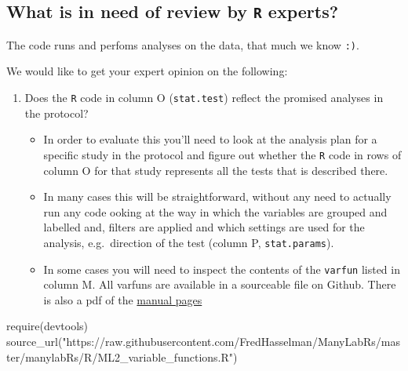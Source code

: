 \documentclass[]{article}
\newenvironment{Shaded}{\begin{snugshade}}{\end{snugshade}}
\newcommand{\KeywordTok}[1]{\textcolor[rgb]{0.94,0.87,0.69}{{#1}}}
\newcommand{\StringTok}[1]{\textcolor[rgb]{0.80,0.58,0.58}{{#1}}}
\newcommand{\NormalTok}[1]{\textcolor[rgb]{0.80,0.80,0.80}{{#1}}}
\begin{document}
\subsection{What is in need of review by \texttt{R}
experts?}\label{what-is-in-need-of-review-by-r-experts}

The code runs and perfoms analyses on the data, that much we know
\texttt{:)}.

We would like to get your expert opinion on the following:

\begin{enumerate}
\def\labelenumi{\arabic{enumi}.}
\itemsep1pt\parskip0pt
\item
  Does the \texttt{R} code in column O (\texttt{stat.test}) reflect the
  promised analyses in the protocol?

  \begin{itemize}
  \itemsep1pt\parskip0pt
  \item
    In order to evaluate this you'll need to look at the analysis plan
    for a specific study in the protocol and figure out whether the
    \texttt{R} code in rows of column O for that study represents all
    the tests that is described there.\\
  \item
    In many cases this will be straightforward, without any need to
    actually run any code ooking at the way in which the variables are
    grouped and labelled and, filters are applied and which settings are
    used for the analysis, e.g.~direction of the test (column P,
    \texttt{stat.params}).
  \item
    In some cases you will need to inspect the contents of the
    \texttt{varfun} listed in column M. All varfuns are available in a
    sourceable file on Github. There is also a pdf of the
    \href{https://github.com/FredHasselman/ManyLabRs/blob/master/ManyLabRs.pdf}{manual
    pages}
  \end{itemize}
\end{enumerate}

\begin{Shaded}
\begin{Highlighting}[]
\KeywordTok{require}\NormalTok{(devtools)}
\KeywordTok{source_url}\NormalTok{(}\StringTok{"https://raw.githubusercontent.com/FredHasselman/ManyLabRs/master/manylabRs/R/ML2_variable_functions.R"}\NormalTok{)}
\end{Highlighting}
\end{Shaded}
\end{document}
